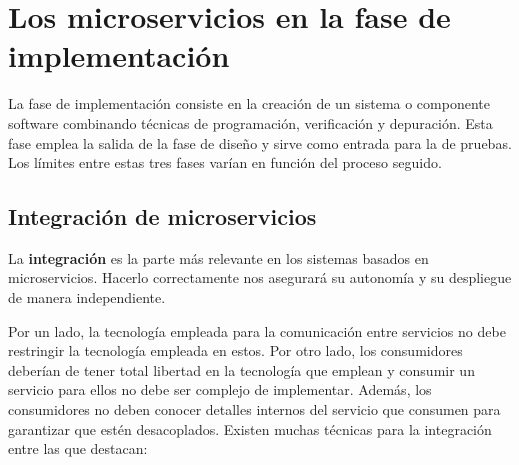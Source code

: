 \documentclass[11pt,spanish,listoffigures]{tfgetsinf}
\begin{document}
\section{Los microservicios en la fase de implementación}

La fase de implementación consiste en la creación de un sistema o componente software combinando técnicas de programación, verificación y depuración. Esta fase emplea la salida de la fase de diseño y sirve como entrada para la de pruebas. Los límites entre estas tres fases varían en función del proceso seguido. \cite{Bourque2014}

\subsection{Integración de microservicios}

La \textbf{integración} es la parte más relevante en los sistemas basados en microservicios. Hacerlo correctamente nos asegurará su autonomía y su despliegue de manera independiente.

Por un lado, la tecnología empleada para la comunicación entre servicios no debe restringir la tecnología empleada en estos. Por otro lado, los consumidores deberían de tener total libertad en la tecnología que emplean y consumir un servicio para ellos no debe ser complejo de implementar. Además, los consumidores no deben conocer detalles internos del servicio que consumen para garantizar que estén desacoplados. \cite{Newman2015a} Existen muchas técnicas para la integración entre las que destacan: 
\end{document}
